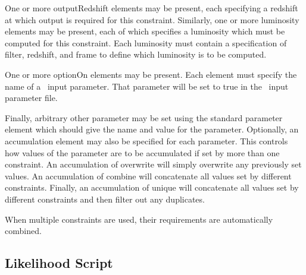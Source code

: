 One or more {\normalfont \ttfamily outputRedshift} elements may be present, each specifying a redshift at which output is required for this constraint. Similarly, one or more {\normalfont \ttfamily luminosity} elements may be present, each of which specifies a luminosity which must be computed for this constraint. Each {\normalfont \ttfamily luminosity} must contain a specification of {\normalfont \ttfamily filter}, {\normalfont \ttfamily redshift}, and {\normalfont \ttfamily frame} to define which luminosity is to be computed.

One or more {\normalfont \ttfamily optionOn} elements may be present. Each element must specify the name of a \glc\ input parameter. That parameter will be set to {\normalfont \ttfamily true} in the \glc\ input parameter file.

Finally, arbitrary other parameter may be set using the standard {\normalfont \ttfamily parameter} element which should give the {\normalfont \ttfamily name} and {\normalfont \ttfamily value} for the parameter. Optionally, an {\normalfont \ttfamily accumulation} element may also be specified for each {\normalfont \ttfamily parameter}. This controls how values of the parameter are to be accumulated if set by more than one constraint. An accumulation of {\normalfont \ttfamily overwrite} will simply overwrite any previously set values. An accumulation of {\normalfont \ttfamily combine} will concatenate all values set by different constraints. Finally, an accumulation of {\normalfont \ttfamily unique} will concatenate all values set by different constraints and then filter out any duplicates.

When multiple constraints are used, their requirements are automatically combined.

\subsection{Likelihood Script}


